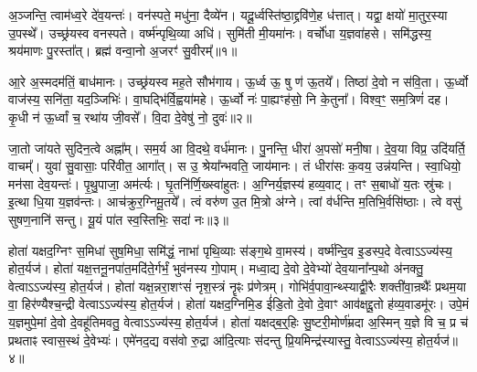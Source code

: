 \clearpage
{}
\setcounter{anuvakam}{0}

अ॒ञ्जन्ति॒ त्वाम॑ध्व॒रे दे॑व॒यन्तः॑।
वन॑स्पते॒ मधु॑ना॒ दैव्ये॑न।
यदू॒र्ध्वस्ति॑ष्ठा॒द्द्रवि॑णे॒ह ध॑त्तात्।
यद्वा॒ क्षयो॑ मा॒तुर॒स्या उ॒पस्थे᳚।
उच्छ्र॑यस्व वनस्पते।
वर्ष्म॑न्पृथि॒व्या अधि॑।
सुमि॑ती मी॒यमा॑नः।
वर्चो॑धा य॒ज्ञवा॑हसे।
समि॑द्धस्य॒ श्रय॑माणः पु॒रस्ता᳚त्।
ब्रह्म॑ वन्वा॒नो अ॒जरꣳ॑ सु॒वीरम्᳚॥१॥\ip

आ॒रे अ॒स्मदम॑तिं॒ बाध॑मानः।
उच्छ्र॑यस्व मह॒ते सौभ॑गाय।
ऊ॒र्ध्व ऊ॒ षु ण॑ ऊ॒तये᳚।
तिष्ठा॑ दे॒वो न स॑वि॒ता।
ऊ॒र्ध्वो वाज॑स्य॒ सनि॑ता॒ यद॒ञ्जिभिः॑।
वा॒घद्भि॑र्वि॒ह्वया॑महे।
ऊ॒र्ध्वो नः॑ पा॒ह्यꣳह॑सो॒ नि के॒तुना᳚।
विश्व॒ꣳ॒ सम॒त्रिणं॑ दह।
कृ॒धी न॑ ऊ॒र्ध्वां च॒ रथा॑य जी॒वसे᳚।
वि॒दा दे॒वेषु॑ नो॒ दुवः॑॥२॥\ip

जा॒तो जा॑यते सुदिन॒त्वे अह्ना᳚म्।
सम॒र्य आ वि॒दथे॒ वर्ध॑मानः।
पु॒नन्ति॒ धीरा॑ अ॒पसो॑ मनी॒षा।
दे॒व॒या विप्र॒ उदि॑यर्ति॒ वाचम्᳚।
युवा॑ सु॒वासाः॒ परि॑वीत॒ आगा᳚त्।
स उ॒ श्रेया᳚न्भवति॒ जाय॑मानः।
तं धीरा॑सः क॒वय॒ उन्न॑यन्ति।
स्वा॒धियो॒ मन॑सा देव॒यन्तः॑।
पृ॒थु॒पाजा॒ अम॑र्त्यः।
घृ॒तनि॑र्णि॒ख्स्वा॑हुतः।
अ॒ग्निर्य॒ज्ञस्य॑ हव्य॒वाट्।
तꣳ स॒बाधो॑ य॒तः स्रु॑चः।
इ॒त्था धि॒या य॒ज्ञव॑न्तः।
आच॑क्रुर॒ग्निमू॒तये᳚।
त्वं वरु॑ण उ॒त मि॒त्रो अ॑ग्ने।
त्वां व॑र्धन्ति म॒तिभि॒र्वसि॑ष्ठाः।
त्वे वसु॑ सुषण॒नानि॑ सन्तु।
यू॒यं पा॑त स्व॒स्तिभिः॒ सदा॑ नः॥३॥\ip\anuvakamend[सु॒वीरं॒ दुवः॒ स्वा॑हुतो॒\-ऽष्टौ च॑]

होता॑ यक्षद॒ग्निꣳ स॒मिधा॑ सुष॒मिधा॒ समि॑द्धं॒ नाभा॑ पृथि॒व्याः स॑ङ्ग॒थे वा॒मस्य॑।
वर्ष्म॑न्दि॒व इ॒डस्प॒दे वेत्वा\-ऽ\-ऽ\-ज्य॑स्य॒ होत॒र्यज॑।
होता॑ यक्ष॒त्तनू॒नपा॑त॒मदि॑ते॒र्गर्भं॒ भुव॑नस्य गो॒पाम्।
मध्वा॒द्य दे॒वो दे॒वेभ्यो॑ देव॒याना᳚न्प॒थो अ॑नक्तु॒ वेत्वा\-ऽ\-ऽ\-ज्य॑स्य॒ होत॒र्यज॑।
होता॑ यक्ष॒न्नरा॒शꣳसं॑ नृश॒स्त्रं नॄꣴः प्र॑णेत्रम्।
गोभि॑र्व॒पावा॒न्थ्स्याद्वी॒रैः शक्ती॑वा॒न्रथैः᳚ प्रथम॒या वा॒ हिर॑ण्यैश्च॒न्द्री वेत्वा\-ऽ\-ऽ\-ज्य॑स्य॒ होत॒र्यज॑।
होता॑ यक्षद॒ग्निमि॒ड ई॑डि॒तो दे॒वो दे॒वाꣳ आव॑क्षद्दू॒तो ह॑व्य॒वाडमू॑रः।
उपे॒मं य॒ज्ञमुपे॒मां दे॒वो दे॒वहू॑तिमवतु॒ वेत्वा\-ऽ\-ऽ\-ज्य॑स्य॒ होत॒र्यज॑।
होता॑ यक्षद्ब॒र्‌॒\mbox{}हिः सु॒ष्टरी॒मोर्ण॑म्रदा अ॒स्मिन् य॒ज्ञे वि च॒ प्र च॑ प्रथताꣴ स्वास॒स्थं दे॒वेभ्यः॑।
एमे॑नद॒द्य वस॑वो रु॒द्रा आ॑दि॒त्याः स॑दन्तु प्रि॒यमिन्द्र॑स्यास्तु॒ वेत्वा\-ऽ\-ऽ\-ज्य॑स्य॒ होत॒र्यज॑॥४॥\ip

